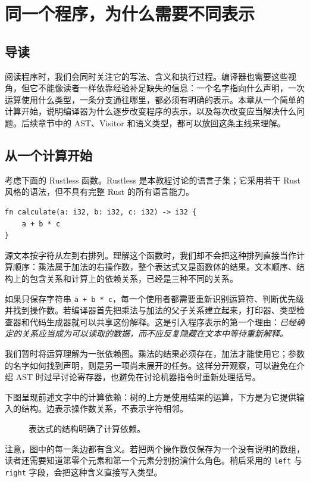 \chapter{同一个程序，为什么需要不同表示}
\label{chap:front-representations}

\section*{导读}
阅读程序时，我们会同时关注它的写法、含义和执行过程。编译器也需要这些视角，但它不能像读者一样依靠经验补足缺失的信息：一个名字指向什么声明，一次运算使用什么类型，一条分支通往哪里，都必须有明确的表示。本章从一个简单的计算开始，说明编译器为什么逐步改变程序的表示，以及每次改变应当解决什么问题。后续章节中的 AST、Visitor 和语义类型，都可以放回这条主线来理解。

\section{从一个计算开始}
考虑下面的 Rustless 函数。Rustless 是本教程讨论的语言子集；它采用若干 Rust 风格的语法，但不具有完整 Rust 的所有语言能力。
\begin{lstlisting}[language=Rustless]
fn calculate(a: i32, b: i32, c: i32) -> i32 {
    a + b * c
}
\end{lstlisting}
源文本按字符从左到右排列。理解这个函数时，我们却不会把这种排列直接当作计算顺序：乘法属于加法的右操作数，整个表达式又是函数体的结果。文本顺序、结构上的包含关系和计算上的依赖关系，已经是三种不同的关系。

如果只保存字符串 \texttt{a + b * c}，每一个使用者都需要重新识别运算符、判断优先级并找到操作数。若编译器首先把乘法与加法的父子关系建立起来，打印器、类型检查器和代码生成器就可以共享这份解释。这是引入程序表示的第一个理由：\emph{已经确定的关系应当成为可以读取的数据，而不应反复隐藏在文本中等待重新解释。}

我们暂时将运算理解为一张依赖图。乘法的结果必须存在，加法才能使用它；参数的名字如何找到声明，则是另一项尚未展开的任务。这样分开观察，可以避免在介绍 AST 时过早讨论寄存器，也避免在讨论机器指令时重新处理括号。

下图呈现前述文字中的计算依赖：树的上方是使用结果的运算，下方是为它提供输入的结构。边表示操作数关系，不表示字符相邻。
\begin{figure}[htbp]
\centering
{}
\caption{表达式的结构明确了计算依赖。}
\label{fig:front-expression-dependency}
\end{figure}
注意，图中的每一条边都有含义。若把两个操作数仅保存为一个没有说明的数组，读者还需要知道第零个元素和第一个元素分别扮演什么角色。稍后采用的 \texttt{left} 与 \texttt{right} 字段，会把这种含义直接写入类型。

